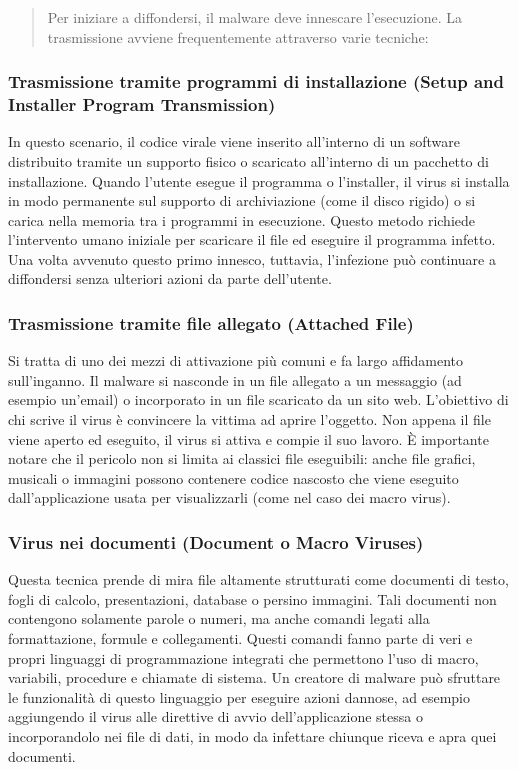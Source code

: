 \documentclass{article}
\begin{document}
\begin{quote}
    Per iniziare a diffondersi, il malware deve innescare l'esecuzione. La trasmissione avviene frequentemente attraverso varie tecniche:
\end{quote}

\subsubsection*{Trasmissione tramite programmi di installazione (Setup and Installer Program Transmission)}

In questo scenario, il codice virale viene inserito all'interno di un software distribuito tramite un supporto fisico o scaricato all'interno di un pacchetto di installazione. Quando l'utente esegue il programma o l'installer, il virus si installa in modo permanente sul supporto di archiviazione (come il disco rigido) o si carica nella memoria tra i programmi in esecuzione. Questo metodo richiede l'intervento umano iniziale per scaricare il file ed eseguire il programma infetto. Una volta avvenuto questo primo innesco, tuttavia, l'infezione può continuare a diffondersi senza ulteriori azioni da parte dell'utente.

\subsubsection*{Trasmissione tramite file allegato (Attached File)}

Si tratta di uno dei mezzi di attivazione più comuni e fa largo affidamento sull'inganno. Il malware si nasconde in un file allegato a un messaggio (ad esempio un'email) o incorporato in un file scaricato da un sito web. L'obiettivo di chi scrive il virus è convincere la vittima ad aprire l'oggetto. Non appena il file viene aperto ed eseguito, il virus si attiva e compie il suo lavoro. È importante notare che il pericolo non si limita ai classici file eseguibili: anche file grafici, musicali o immagini possono contenere codice nascosto che viene eseguito dall'applicazione usata per visualizzarli (come nel caso dei macro virus).

\subsubsection*{Virus nei documenti (Document o Macro Viruses)}

Questa tecnica prende di mira file altamente strutturati come documenti di testo, fogli di calcolo, presentazioni, database o persino immagini. Tali documenti non contengono solamente parole o numeri, ma anche comandi legati alla formattazione, formule e collegamenti. Questi comandi fanno parte di veri e propri linguaggi di programmazione integrati che permettono l'uso di macro, variabili, procedure e chiamate di sistema. Un creatore di malware può sfruttare le funzionalità di questo linguaggio per eseguire azioni dannose, ad esempio aggiungendo il virus alle direttive di avvio dell'applicazione stessa o incorporandolo nei file di dati, in modo da infettare chiunque riceva e apra quei documenti.
\end{document}
